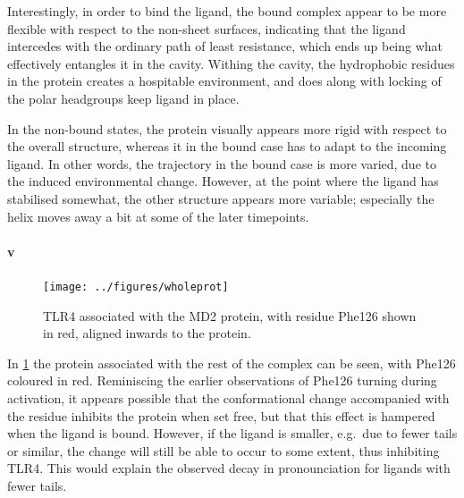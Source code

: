 \documentclass[10pt]{article}\usepackage[]{graphicx}\usepackage[]{color}
\theoremstyle{plain}
\begin{document}
\begin{multicols*}{2}
	Interestingly, in order to bind the ligand, the bound complex appear to be more flexible with respect to the non-sheet surfaces, indicating that the ligand intercedes with the ordinary path of least resistance, which ends up being what effectively entangles it in the cavity. Withing the cavity, the hydrophobic residues in the protein creates a hospitable environment, and does along with locking of the polar headgroups keep ligand in place. 
	
	In the non-bound states, the protein visually appears more rigid with respect to the overall structure, whereas it in the bound case has to adapt to the incoming ligand. In other words, the trajectory in the bound case is more varied, due to the induced environmental change. However, at the point where the ligand has stabilised somewhat, the other structure appears more variable; especially the helix moves away a bit at some of the later timepoints. 
	
\end{multicols*}
	\paragraph*{v}
	  \begin{figure}[t]
		\centering
		\texttt{[image: ../figures/wholeprot]}
		\caption{TLR4 associated with the MD2 protein, with residue Phe126 shown in red, aligned inwards to the protein.}
		\label{fig:wholeprot}
	\end{figure}
\begin{multicols*}{2}
In \cref{fig:wholeprot} the protein associated with the rest of the complex can be seen, with Phe126 coloured in red. Reminiscing the earlier observations of Phe126 turning during activation, it appears possible that the conformational change accompanied with the residue inhibits the protein when set free, but that this effect is hampered when the ligand is bound. However, if the ligand is smaller, e.g.\ due to fewer tails or similar, the change will still be able to occur to some extent, thus inhibiting TLR4. This would explain the observed decay in pronounciation for ligands with fewer tails. 
	

\end{multicols*}
\end{document}
